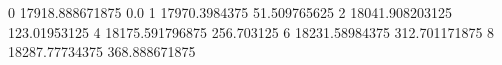 0 17918.888671875 0.0
1 17970.3984375 51.509765625
2 18041.908203125 123.01953125
4 18175.591796875 256.703125
6 18231.58984375 312.701171875
8 18287.77734375 368.888671875
